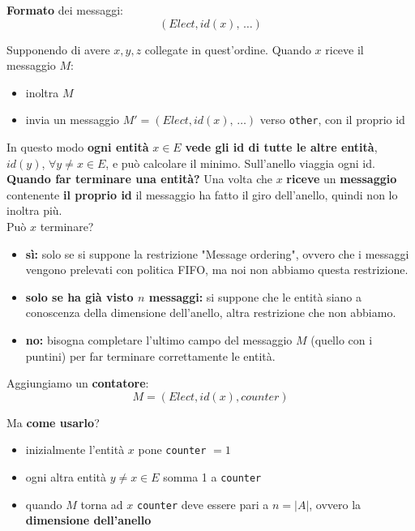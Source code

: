 \textbf{Formato} dei messaggi: 
$$(Elect, id(x), \, \dots)$$

Supponendo di avere $x,y,z$ collegate in quest'ordine. Quando $x$ riceve il messaggio $M$:
\begin{itemize}
	\item inoltra $M$ 
	\item invia un messaggio $M' = (Elect, id(x), \, \dots)$ verso \texttt{other}, con il proprio id
\end{itemize}

In questo modo \textbf{ogni entità} $x \in E$ \textbf{vede gli id di tutte le altre entità}, $id(y)$, $\forall y \neq x \in E$, e può calcolare il minimo. Sull'anello viaggia ogni id.\\

\textbf{Quando far terminare una entità?} Una volta che $x$ \textbf{riceve} un \textbf{messaggio} contenente \textbf{il proprio id} il messaggio ha fatto il giro dell'anello, quindi non lo inoltra più.\\

Può $x$ terminare? 
\begin{itemize}
	\item \textbf{sì:} solo se si suppone la restrizione "Message ordering", ovvero che i messaggi vengono prelevati con politica FIFO, ma noi non abbiamo questa restrizione.\\
	
	\item \textbf{solo se ha già visto $n$ messaggi:} si suppone che le entità siano a conoscenza della dimensione dell'anello, altra restrizione che non abbiamo.\\
	
	\item \textbf{no:} bisogna completare l'ultimo campo del messaggio $M$ (quello con i puntini) per far terminare correttamente le entità.\\
\end{itemize}

\newpage

Aggiungiamo un \textbf{contatore}: 
$$ M = (Elect, id(x), counter) $$

Ma \textbf{come usarlo}? 
\begin{itemize}
	\item inizialmente l'entità $x$ pone \texttt{counter} $=1$
	\item ogni altra entità $y \neq x \in E$ somma 1 a \texttt{counter}
	\item quando $M$ torna ad $x$ \texttt{counter} deve essere pari a $n = |A|$, ovvero la \textbf{dimensione dell'anello}
\end{itemize}

